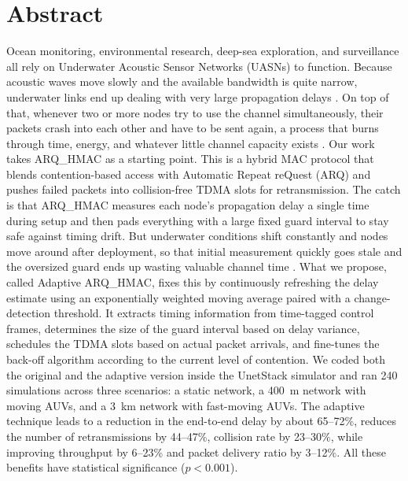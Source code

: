 \documentclass{article}
\begin{document}
\section*{Abstract}
{

Ocean monitoring, environmental research, deep-sea exploration, and surveillance all rely on Underwater Acoustic Sensor Networks (UASNs) to function. Because acoustic waves move slowly and the available bandwidth is quite narrow, underwater links end up dealing with very large propagation delays \cite{akyildiz2005,casari2011,jiang2018,kulla2022}. On top of that, whenever two or more nodes try to use the channel simultaneously, their packets crash into each other and have to be sent again, a process that burns through time, energy, and whatever little channel capacity exists \cite{casari2011,kulla2022,uwmac2007}. Our work takes ARQ\_HMAC \cite{dao2025} as a starting point. This is a hybrid MAC protocol that blends contention-based access with Automatic Repeat reQuest (ARQ) and pushes failed packets into collision-free TDMA slots for retransmission. The catch is that ARQ\_HMAC measures each node's propagation delay a single time during setup and then pads everything with a large fixed guard interval to stay safe against timing drift. But underwater conditions shift constantly and nodes move around after deployment, so that initial measurement quickly goes stale and the oversized guard ends up wasting valuable channel time \cite{casari2011,molinares2009}. What we propose, called Adaptive ARQ\_HMAC, fixes this by continuously refreshing the delay estimate using an exponentially weighted moving average paired with a change-detection threshold. It extracts timing information from time-tagged control frames, determines the size of the guard interval based on delay variance, schedules the TDMA slots based on actual packet arrivals, and fine-tunes the back-off algorithm according to the current level of contention. We coded both the original and the adaptive version inside the UnetStack simulator and ran 240 simulations across three scenarios: a static network, a 400~m network with moving AUVs, and a 3~km network with fast-moving AUVs. The adaptive technique leads to a reduction in the end-to-end delay by about 65--72\%, reduces the number of retransmissions by 44--47\%, collision rate by 23--30\%, while improving throughput by 6--23\% and packet delivery ratio by 3--12\%. All these benefits have statistical significance ($p < 0.001$).
\par}

\newpage
\end{document}
